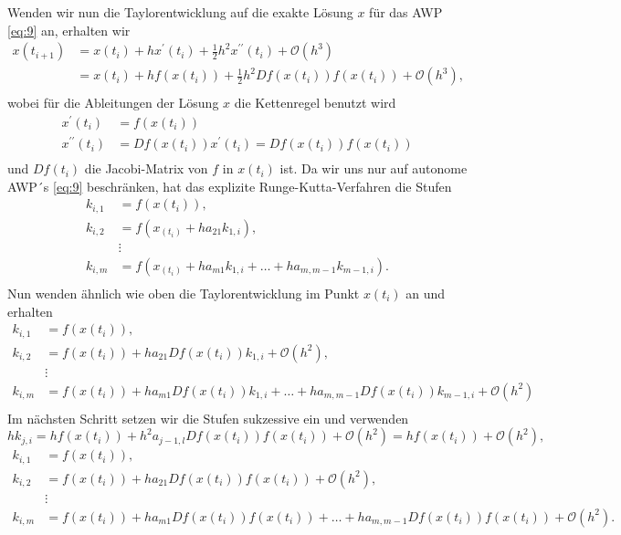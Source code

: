 Wenden wir nun die Taylorentwicklung auf die exakte Lösung $x$ für das AWP \eqref{eq:9} an, erhalten wir
\begin{align*}
    x(t_{i+1}) &= x(t_i) + hx^{\prime}(t_i) + \frac{1}{2} h^2 x^{\prime \prime}(t_i) + \mathcal{O}(h^3) \\
    &= x(t_i) + hf(x(t_i)) + \frac{1}{2} h^2 Df(x(t_i)) f(x(t_i)) + \mathcal{O}(h^3),\\
\end{align*}
wobei für die Ableitungen der Lösung $x$ die Kettenregel benutzt wird
\begin{align*}
    x^{\prime}(t_i) &= f(x(t_i))\\
    x^{\prime \prime}(t_i) &= Df(x(t_i))x^{\prime}(t_i) = Df(x(t_i))f(x(t_i))\\
\end{align*}
und $Df(t_i)$ die Jacobi-Matrix von $f$ in $x(t_i)$ ist. Da wir uns nur auf autonome AWP´s \eqref{eq:9} beschränken, hat
das explizite Runge-Kutta-Verfahren die Stufen
\begin{align*}
    k_{i,1} &= f(x(t_i)), \\
    k_{i,2} &= f(x_(t_i) + ha_{21}k_{1,i}), \\
    &\vdots\\
    k_{i,m} &= f(x_(t_i) + ha_{m1}k_{1,i} + \dots + ha_{m,m-1}k_{m-1,i}).\\
\end{align*}
Nun wenden ähnlich wie oben die Taylorentwicklung im Punkt $x(t_i)$ an und erhalten
\begin{align*}
    k_{i,1} &= f(x(t_i)), \\
    k_{i,2} &= f(x(t_i)) + ha_{21}Df(x(t_i))k_{1,i} + \mathcal{O}(h^2), \\
    &\vdots\\
    k_{i,m} &= f(x(t_i)) + ha_{m1}Df(x(t_i))k_{1,i} + \dots + ha_{m,m-1}Df(x(t_i))k_{m-1,i} + \mathcal{O}(h^2) \\
\end{align*}
Im nächsten Schritt setzen wir die Stufen sukzessive ein und verwenden
\[
    h k_{j,i} = hf(x(t_i)) + h^2 a_{j-1,l}Df(x(t_i))f(x(t_i)) + \mathcal{O}(h^2) = hf(x(t_i)) + \mathcal{O}(h^2),
\]
\begin{align*}
    k_{i,1} &= f(x(t_i)), \\
    k_{i,2} &= f(x(t_i)) + ha_{21}Df(x(t_i))f(x(t_i)) + \mathcal{O}(h^2), \\
    &\vdots\\
    k_{i,m} &= f(x(t_i)) + ha_{m1}Df(x(t_i))f(x(t_i)) + \dots + ha_{m,m-1}Df(x(t_i))f(x(t_i)) + \mathcal{O}(h^2). \\
\end{align*}
